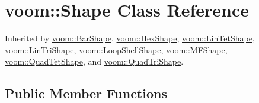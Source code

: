 \hypertarget{classvoom_1_1_shape}{
\section{voom::Shape Class Reference}
\label{classvoom_1_1_shape}
}


Inherited by \hyperlink{classvoom_1_1_bar_shape}{voom::BarShape}, \hyperlink{classvoom_1_1_hex_shape}{voom::HexShape}, \hyperlink{classvoom_1_1_lin_tet_shape}{voom::LinTetShape}, \hyperlink{classvoom_1_1_lin_tri_shape}{voom::LinTriShape}, \hyperlink{classvoom_1_1_loop_shell_shape}{voom::LoopShellShape}, \hyperlink{classvoom_1_1_m_f_shape}{voom::MFShape}, \hyperlink{classvoom_1_1_quad_tet_shape}{voom::QuadTetShape}, and \hyperlink{classvoom_1_1_quad_tri_shape}{voom::QuadTriShape}.\subsection*{Public Member Functions}
